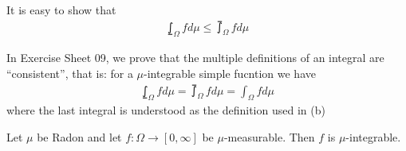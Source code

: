 \begin{rem}[]
  It is easy to show that
  \begin{align*}
    \lowint_{\Omega} f d \mu \leq \upint_{\Omega} f d \mu
  \end{align*}

  In Exercise Sheet 09, we prove that the multiple definitions of an integral are ``consistent'', that is: for a $\mu$-integrable simple fucntion we have
  \begin{align*}
    \lowint_{\Omega} f d \mu = \upint_{\Omega} f d \mu = \int_{\Omega} f d \mu
  \end{align*}
  where the last integral is understood as the definition used in (b)
\end{rem}

\begin{prop}[] \label{prop:measurable-implies-integrable}
  Let $\mu$ be Radon and
  let $f: \Omega \to [0,\infty]$ be $\mu$-measurable. Then $f$ is $\mu$-integrable.
\end{prop}
